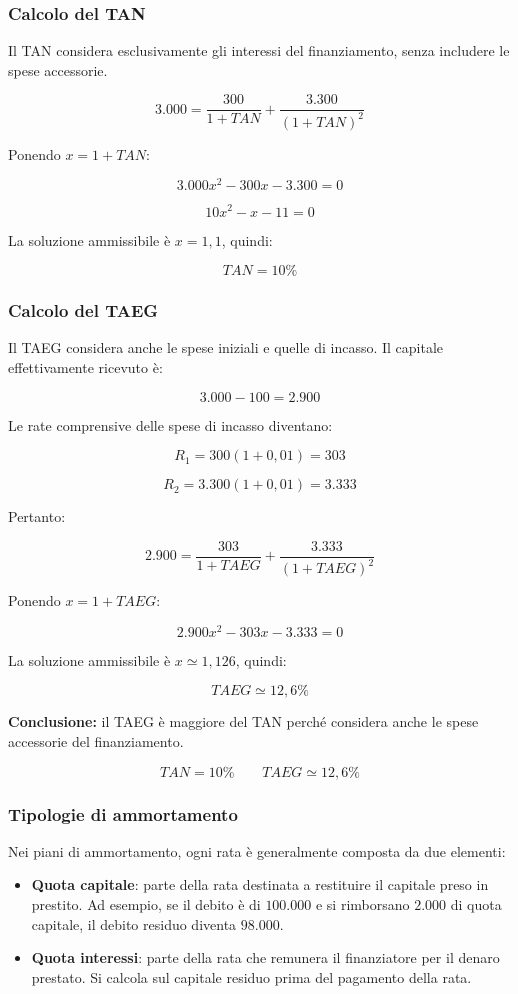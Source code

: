 \subsubsection*{Calcolo del TAN}

\noindent Il TAN considera esclusivamente gli interessi del finanziamento, senza includere le spese accessorie.

\[
3.000=\frac{300}{1+TAN}+
\frac{3.300}{(1+TAN)^2}
\]

\noindent Ponendo $x=1+TAN$:

\[
3.000x^2-300x-3.300=0
\]

\[
10x^2-x-11=0
\]

\noindent La soluzione ammissibile è $x=1,1$, quindi:

\[
\boxed{TAN=10\%}
\]

\subsubsection*{Calcolo del TAEG}

\noindent Il TAEG considera anche le spese iniziali e quelle di incasso. Il capitale effettivamente ricevuto è:

\[
3.000-100=2.900
\]

\noindent Le rate comprensive delle spese di incasso diventano:

\[
R_1=300(1+0,01)=303
\]

\[
R_2=3.300(1+0,01)=3.333
\]

\noindent Pertanto:

\[
2.900=\frac{303}{1+TAEG}+
\frac{3.333}{(1+TAEG)^2}
\]

\noindent Ponendo $x=1+TAEG$:

\[
2.900x^2-303x-3.333=0
\]

\noindent La soluzione ammissibile è $x\simeq1,126$, quindi:

\[
\boxed{TAEG\simeq12,6\%}
\]

\noindent \textbf{Conclusione:} il TAEG è maggiore del TAN perché considera anche le spese accessorie del finanziamento.

\[
\boxed{TAN=10\% \qquad TAEG\simeq12,6\%}
\]
\subsubsection*{Tipologie di ammortamento}

\noindent Nei piani di ammortamento, ogni rata è generalmente composta da due elementi:

\begin{itemize}
    \item \textbf{Quota capitale}: parte della rata destinata a restituire il capitale preso in prestito. Ad esempio, se il debito è di $100.000$ e si rimborsano $2.000$ di quota capitale, il debito residuo diventa $98.000$.

    \item \textbf{Quota interessi}: parte della rata che remunera il finanziatore per il denaro prestato. Si calcola sul capitale residuo prima del pagamento della rata.
\end{itemize}

